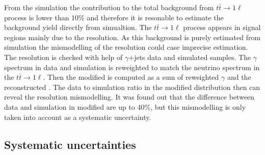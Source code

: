 From the simulation the contribution to the total background from $t\bar{t} \to 1\ell$ process is lower than 10\% and therefore it is resonable to estimate the background yield directly from simualtion. The $t\bar{t} \to 1\ell$ process appears in signal regions mainly due to the \MET resolution. As this background is purely estimated from simulation the mismodelling of the \MET resolution could case imprecise estimation. The \MET resolution is checked with help of $\gamma$+jets data and simulated samples. The $\gamma$ \pt spectrum in data and simulation is reweighted to match the neutrino \pt spectrum in the $t\bar{t} \to 1\ell$. Then the modified \MET is computed as a sum of reweighted $\gamma$ \pt and the reconstructed \MET. The data to simulation ratio in the modified \MET distribution then can reveal the \MET resolution mismodelling. It was found out that the difference between data and simulation in modified \MET are up to 40\%, but this mismodelling is only taken into account as a systematic uncertainty. %
 

\subsection{Systematic uncertainties~\label{sec:systematics}}

